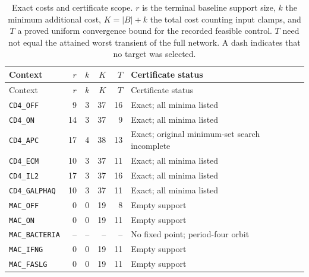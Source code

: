 \begin{longtable}{@{}lrrrrp{41mm}@{}}
\caption{Exact costs and certificate scope. $r$ is the terminal baseline
support size, $k$ the minimum additional cost, $K=|B|+k$ the total cost
counting input clamps, and $T$ a proved uniform convergence bound for
the recorded feasible control. $T$ need not equal the attained worst
transient of the full network. A dash indicates that no target was
selected.}\label{tab:largeoutcomes}\\
\toprule Context & $r$ & $k$ & $K$ & $T$ & Certificate status\\\midrule\endfirsthead
\toprule Context & $r$ & $k$ & $K$ & $T$ & Certificate status\\\midrule\endhead
\bottomrule\endfoot
\texttt{CD4\_OFF} & 9 & 3 & 37 & 16 & Exact; all minima listed\\
\texttt{CD4\_ON} & 14 & 3 & 37 & 9 & Exact; all minima listed\\
\texttt{CD4\_APC} & 17 & 4 & 38 & 13 & Exact; original minimum-set search incomplete\\
\texttt{CD4\_ECM} & 10 & 3 & 37 & 11 & Exact; all minima listed\\
\texttt{CD4\_IL2} & 17 & 3 & 37 & 16 & Exact; all minima listed\\
\texttt{CD4\_GALPHAQ} & 10 & 3 & 37 & 11 & Exact; all minima listed\\
\texttt{MAC\_OFF} & 0 & 0 & 19 & 8 & Empty support\\
\texttt{MAC\_ON} & 0 & 0 & 19 & 11 & Empty support\\
\texttt{MAC\_BACTERIA} & -- & -- & -- & -- & No fixed point; period-four orbit\\
\texttt{MAC\_IFNG} & 0 & 0 & 19 & 11 & Empty support\\
\texttt{MAC\_FASLG} & 0 & 0 & 19 & 11 & Empty support\\
\end{longtable}

